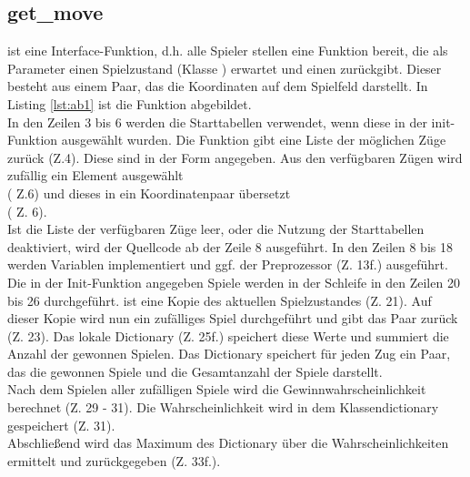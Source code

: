 \subsection*{get\_move}
  ist eine Interface-Funktion, d.h. alle Spieler stellen eine Funktion  bereit, die als Parameter einen Spielzustand (Klasse ) erwartet und einen  zurückgibt. Dieser besteht aus einem Paar, das die Koordinaten auf dem Spielfeld darstellt. In Listing \ref{lst:ab1} ist die Funktion abgebildet.
\vspace{0.5cm}
\\In den Zeilen 3 bis 6 werden die Starttabellen verwendet, wenn diese in der init-Funktion ausgewählt wurden. Die Funktion  gibt eine Liste der möglichen Züge zurück (Z.4). Diese sind in der Form  angegeben. Aus den verfügbaren Zügen wird zufällig ein Element ausgewählt \\( Z.6) und dieses in ein Koordinatenpaar übersetzt \\( Z. 6). 
\\Ist die Liste der verfügbaren Züge leer, oder die Nutzung der Starttabellen deaktiviert, wird der Quellcode ab der Zeile 8 ausgeführt. In den Zeilen 8 bis 18 werden Variablen implementiert und ggf. der Preprozessor (Z. 13f.) ausgeführt.
\\Die in der Init-Funktion angegeben  Spiele werden in der Schleife in den Zeilen 20 bis 26 durchgeführt.
 ist eine Kopie des aktuellen Spielzustandes (Z. 21). Auf dieser Kopie wird nun ein zufälliges Spiel durchgeführt und gibt das Paar  zurück (Z. 23). Das lokale Dictionary  (Z. 25f.) speichert diese Werte und summiert die Anzahl der gewonnen Spielen.
Das Dictionary speichert für jeden Zug ein Paar, das die gewonnen Spiele und die Gesamtanzahl der Spiele darstellt.
\\ Nach dem Spielen aller zufälligen Spiele wird die Gewinnwahrscheinlichkeit berechnet (Z. 29 - 31). Die Wahrscheinlichkeit wird in dem Klassendictionary  gespeichert (Z. 31).
\\Abschließend wird das Maximum des Dictionary über die Wahrscheinlichkeiten ermittelt und zurückgegeben (Z. 33f.).


